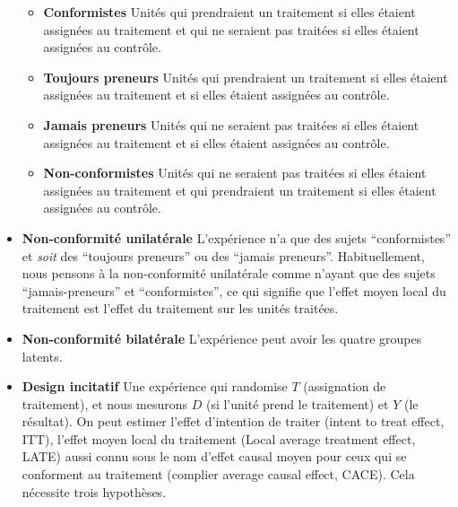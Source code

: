 \documentclass[
  12pt,
]{book}
\providecommand{\tightlist}{%
  \setlength{\itemsep}{0pt}\setlength{\parskip}{0pt}}
\begin{document}
\begin{itemize}
  \begin{itemize}
  \tightlist
  \item
    \textbf{Conformistes} Unités qui prendraient un traitement si elles étaient assignées au traitement et qui ne seraient pas traitées si elles étaient assignées au contrôle.
  \item
    \textbf{Toujours preneurs} Unités qui prendraient un traitement si elles étaient assignées au traitement et si elles étaient assignées au contrôle.
  \item
    \textbf{Jamais preneurs} Unités qui ne seraient pas traitées si elles étaient assignées au traitement et si elles étaient assignées au contrôle.
  \item
    \textbf{Non-conformistes} Unités qui ne seraient pas traitées si elles étaient assignées au traitement et qui prendraient un traitement si elles étaient assignées au contrôle.
  \end{itemize}
\item
  \textbf{Non-conformité unilatérale} L'expérience n'a que des sujets ``conformistes'' et \emph{soit} des ``toujours preneurs'' ou des ``jamais preneurs''.
  Habituellement, nous pensons à la non-conformité unilatérale comme n'ayant que des sujets ``jamais-preneurs'' et ``conformistes'', ce qui signifie que l'effet moyen local du traitement est l'effet du traitement sur les unités traitées.
\item
  \textbf{Non-conformité bilatérale} L'expérience peut avoir les quatre groupes latents.
\item
  \textbf{Design incitatif} Une expérience qui randomise \(T\) (assignation de traitement), et nous mesurons \(D\) (si l'unité prend le traitement) et \(Y\) (le résultat).
  On peut estimer l'effet d'intention de traiter (intent to treat effect, ITT), l'effet moyen local du traitement (Local average treatment effect, LATE) aussi connu sous le nom d'effet causal moyen pour ceux qui se conforment au traitement (complier average causal effect, CACE). Cela nécessite trois hypothèses.


\end{itemize}
\end{document}
